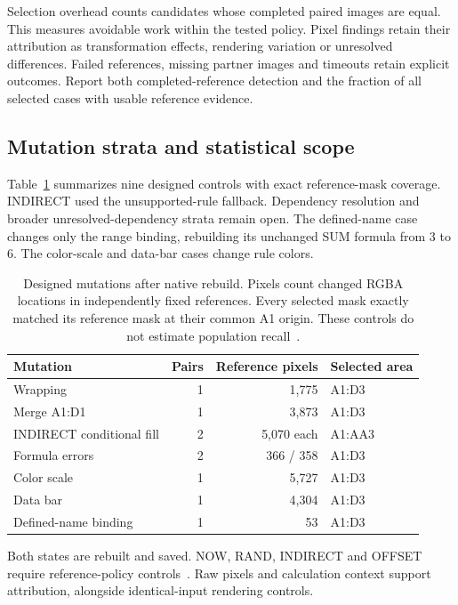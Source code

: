 Selection overhead counts candidates whose completed paired images are equal.
This measures avoidable work within the tested policy. Pixel findings retain
their attribution as transformation effects, rendering variation or unresolved
differences. Failed references, missing partner images and timeouts retain
explicit outcomes. Report both completed-reference detection and the fraction
of all selected cases with usable reference evidence.

\subsection{Mutation strata and statistical scope}
Table~\ref{tab:mutation-masks} summarizes nine designed controls with exact
reference-mask coverage. INDIRECT used the unsupported-rule fallback.
Dependency resolution and broader unresolved-dependency strata remain open.
The defined-name case changes only the range binding, rebuilding its unchanged
SUM formula from 3 to 6. The color-scale and data-bar cases change rule colors.

\begin{table}[t]
\centering
\caption{Designed mutations after native rebuild. Pixels count changed RGBA
locations in independently fixed references. Every selected mask exactly
matched its reference mask at their common A1 origin. These controls do not
estimate population recall~\cite{layoutcontrols,indirectcontrols,errorcontrols,formattingcontrols}.}
\label{tab:mutation-masks}
\begin{tabular}{lrrl}
\hline
Mutation & Pairs & Reference pixels & Selected area \\
\hline
Wrapping & 1 & 1,775 & A1:D3 \\
Merge A1:D1 & 1 & 3,873 & A1:D3 \\
INDIRECT conditional fill & 2 & 5,070 each & A1:AA3 \\
Formula errors & 2 & 366 / 358 & A1:D3 \\
Color scale & 1 & 5,727 & A1:D3 \\
Data bar & 1 & 4,304 & A1:D3 \\
Defined-name binding & 1 & 53 & A1:D3 \\
\hline
\end{tabular}
\end{table}

Both states are rebuilt and saved. NOW, RAND, INDIRECT and OFFSET require
reference-policy controls~\cite{excelrecalculation}. Raw pixels and calculation
context support attribution, alongside identical-input rendering controls.

